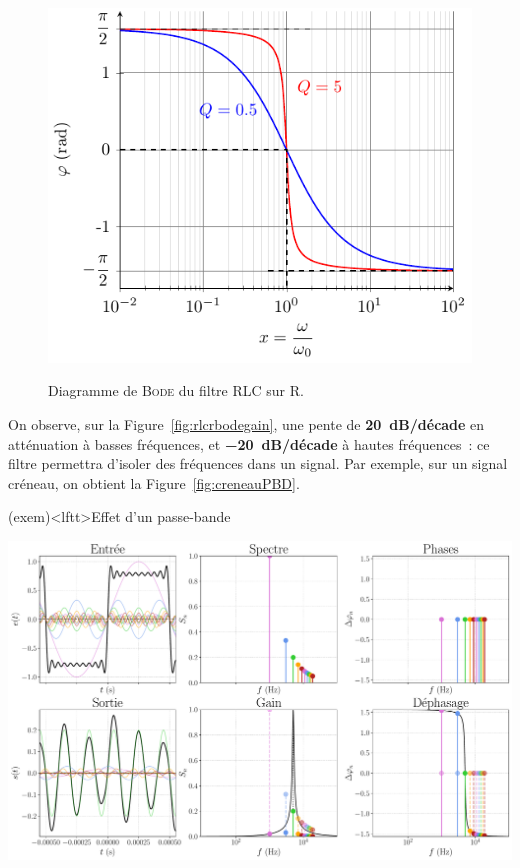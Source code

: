 \documentclass[../../main/main.tex]{subfiles}
\begin{document}
\begin{figure}[htbp!]
{{		}{%
			\includegraphics[width=.90\linewidth]{RLCR_bode-phase}
		}%
		\vspace{-7pt}
	}%
	\vspace{-7pt}
	\caption{Diagramme de \textsc{Bode} du filtre RLC sur R.}
	\label{fig:rlcrbode}
\end{figure}

\vspace{-15pt}
On observe, sur la Figure~\ref{fig:rlcrbodegain}, une pente de
\textbf{\SI{20}{dB/décade}} en atténuation à basses fréquences, et
\textbf{\SI{-20}{dB/décade}} à hautes fréquences~: ce filtre permettra d'isoler
des fréquences dans un signal. Par exemple, sur un signal créneau, on obtient la
Figure~\ref{fig:creneauPBD}.
\begin{tcb*}(exem)<lftt>{Effet d'un passe-bande}
	\begin{center}
		\includegraphics[width=.90\linewidth]{fft_creneau_bth_bande-fe=1000-fc=5000}
		\label{fig:creneauPBD}
	\end{center}
	\vspace{-25pt}
\end{tcb*}
\end{document}
